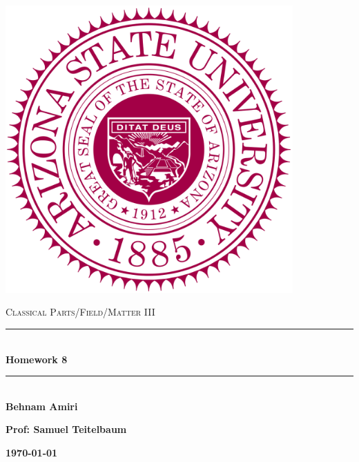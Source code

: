 \documentclass[fleqn]{article}
\begin{document}
  \begin{titlepage}

    \newcommand{\HRule}{\rule{\linewidth}{0.5mm}}

    \center

    \begin{center}
      \includegraphics[height=11cm, width=11cm]{asu.png}
    \end{center}

    \vline

    \textsc{\LARGE Classical Parts/Field/Matter III}\\[1.5cm]

    \HRule \\[0.5cm]
    { \huge \bfseries Homework 8}\\[0.4cm] 
    \HRule \\[1.0cm]

    \textbf{Behnam Amiri}

    \bigbreak

    \textbf{Prof: Samuel Teitelbaum}

    \bigbreak

    \textbf{{\large \today}\\[2cm]}

    \vfill

  \end{titlepage}
\end{document}
